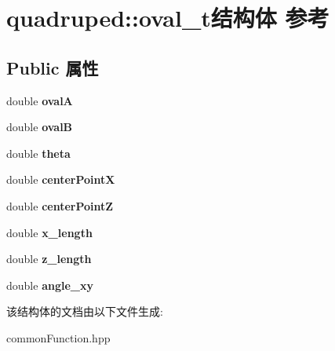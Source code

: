 \hypertarget{structquadruped_1_1oval__t}{}\section{quadruped\+:\+:oval\+\_\+t结构体 参考}
\label{structquadruped_1_1oval__t}
\subsection*{Public 属性}
\begin{DoxyCompactItemize}
\item 
\mbox{\label{structquadruped_1_1oval__t_a85d50226c3153949b0e3e92e9ba70270}} 
double {\bfseries ovalA}
\item 
\mbox{\label{structquadruped_1_1oval__t_acf4b6419d8152035a069893d4d875194}} 
double {\bfseries ovalB}
\item 
\mbox{\label{structquadruped_1_1oval__t_a9c11fdeccb69cbe7053bf88a789b5ac4}} 
double {\bfseries theta}
\item 
\mbox{\label{structquadruped_1_1oval__t_a167b6771d330037fee1afb7c2ebbdd20}} 
double {\bfseries center\+PointX}
\item 
\mbox{\label{structquadruped_1_1oval__t_a0a2071d85cadbf3b239e59dcb5b79e8d}} 
double {\bfseries center\+PointZ}
\item 
\mbox{\label{structquadruped_1_1oval__t_ad2c38c7f67b49ba8239e9999b4ef5514}} 
double {\bfseries x\+\_\+length}
\item 
\mbox{\label{structquadruped_1_1oval__t_a8cd9e09c4cc9e15c22902ebc3d34306d}} 
double {\bfseries z\+\_\+length}
\item 
\mbox{\label{structquadruped_1_1oval__t_a0824289739bea238030fd9fd1f0d666a}} 
double {\bfseries angle\+\_\+xy}
\end{DoxyCompactItemize}


该结构体的文档由以下文件生成\+:\begin{DoxyCompactItemize}
\item 
common\+Function.\+hpp\end{DoxyCompactItemize}
